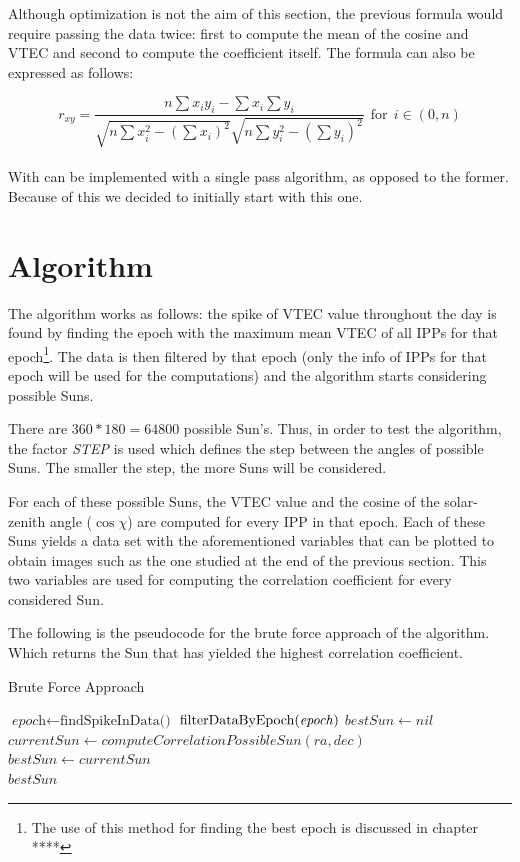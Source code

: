 Although optimization is not the aim of this section, the previous formula would require passing the data twice: first to compute the mean of the cosine and VTEC and second to compute the coefficient itself. The formula can also be expressed as follows:

\begin{equation} \label{eq:singlePass}
r_{xy} = \frac{n\sum x_{i}y_{i} - \sum x_{i}\sum y_{i}}
{\sqrt{n\sum x_{i}^{2} - (\sum x_{i})^{2}}
	\sqrt{n\sum y_{i}^{2} - (\sum y_{i})^{2}}}  \ \ \text{for} \ \ i \in (0, n)
\end{equation} \\

With can be implemented with a single pass algorithm, as opposed to the former. Because of this we decided to initially start with this one.

\section{Algorithm}

The algorithm works as follows: the spike of VTEC value throughout the day is found by finding the epoch with the maximum mean VTEC of all IPPs for that epoch\footnote{The use of this method for finding the best epoch is discussed in chapter **** }.
The data is then filtered by that epoch (only the info of IPPs for that epoch will be used for the computations) and the algorithm starts considering possible Suns.

There are $360 * 180 = 64800$ possible Sun's. Thus, in order to test the algorithm, the factor \textit{STEP} is used which defines the step between the angles of possible Suns. The smaller the step, the more Suns will be considered. 

For each of these possible Suns, the VTEC value and the cosine of the solar-zenith angle ($\cos \chi$) are computed for every IPP in that epoch. Each of these Suns yields a data set with the aforementioned variables that can be plotted to obtain images such as the one studied at the end of the previous section. This two variables are used for computing the correlation coefficient for every considered Sun.

The following is the pseudocode for the brute force approach of the algorithm. Which returns the Sun that has yielded the highest correlation coefficient.

\begin{algorithm}
	\caption{Brute Force Approach}\label{pseudocodeBruteForce}
	\begin{algorithmic}[1]
		\State $\textit{epoch} \gets \text{findSpikeInData()}$ 
		\State $\text{filterDataByEpoch(\textit{epoch})}$
		\State $bestSun \gets nil$
		\State $currentSun \gets computeCorrelationPossibleSun(ra, dec)$
		\State $bestSun \gets currentSun$
		\EndIf
		\EndFor
		\EndFor
		\\
		\Return $bestSun$
		\EndProcedure
	\end{algorithmic}
\end{algorithm}


